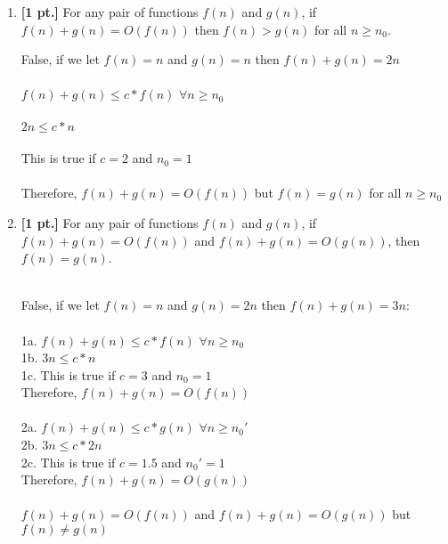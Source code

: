 \documentclass[11pt]{article}
\theoremstyle{definition}
\theoremstyle{theorem}
\newcommand{\solution}{\medskip\noindent{\color{blue}\textbf{Solution:}}}
\begin{document}
\begin{enumerate}[label=(\alph*)]
\newpage
\item \textbf{[1 pt.]} For any pair of functions $f(n)$ and $g(n)$, if $f(n) + g(n) = O(f(n))$ then $f(n) > g(n)$ for all $n \geq n_0$.

\solution

False, if we let $f(n) = n$ and $g(n) = n$ then $f(n) + g(n) = 2n$\\~\\
$f(n) + g(n) \leq c * f(n)$ \hspace{0.4cm} $\forall n \geq n_0$  \\~\\ 
$2n \leq c * n$  \\~\\
This is true if $c = 2$ and $n_0 = 1$ \\~\\
Therefore, $f(n) + g(n) = O(f(n))$ but $f(n) = g(n)$ for all $n \geq n_0$



\item \textbf{[1 pt.]} For any pair of functions $f(n)$ and $g(n)$, if $f(n) + g(n) = O(f(n))$ and $f(n) + g(n) = O(g(n))$, then $f(n) = g(n)$.

\solution \\
False, if we let $f(n) = n$ and $g(n) = 2n$ then $f(n) + g(n) = 3n$: \\~\\
1a. $f(n) + g(n) \leq c * f(n)$ \hspace{0.4cm} $\forall n \geq n_0$  \\
1b. $3n \leq c * n$ \hspace{0.4cm} \\ 
1c. This is true if $c = 3$ and $n_0 = 1$ \\
Therefore, $f(n) + g(n) = O(f(n))$ \\~\\
2a. $f(n) + g(n) \leq c * g(n)$ \hspace{0.4cm} $\forall n \geq n_0'$  \\
2b. $3n \leq c * 2n$ \hspace{0.4cm} \\ 
2c. This is true if $c = 1.5$ and $n_0' = 1$ \\
Therefore, $f(n) + g(n) = O(g(n))$ \\~\\
$f(n) + g(n) = O(f(n))$ and  $f(n) + g(n) = O(g(n))$ but $f(n) \neq g(n)$






\end{enumerate}
\end{document}

